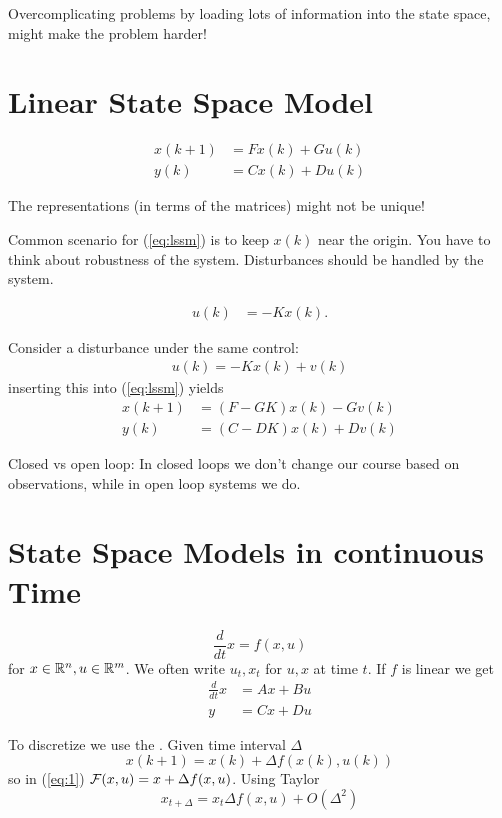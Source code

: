 \begin{remark}
    Overcomplicating problems by loading lots of information into the state space, might make the problem harder!
\end{remark}

\section{Linear State Space Model}

\begin{align}\label{eq:lssm}
    x(k+1)&=Fx(k)+Gu(k)\\
    y(k)&=Cx(k)+Du(k)
\end{align}

\begin{remark}
    The representations (in terms of the matrices) might not be unique!
\end{remark}

Common scenario for (\ref{eq:lssm}) is to keep \(x(k)\) near the origin. You have to think about robustness of the system. 
Disturbances should be handled by the system. 

\begin{align*}
    u(k)&=-Kx(k).
\end{align*}

Consider a disturbance under the same control:
\begin{align*}
    u(k)=-Kx(k)+v(k)
\end{align*} 
inserting this into (\ref{eq:lssm}) yields
\begin{align*}
    x(k+1) &= (F-GK)x(k)-Gv(k)\\
    y(k) &= (C-DK)x(k)+Dv(k)
\end{align*}

Closed vs open loop: In closed loops we don't change our course based on observations, while in open loop systems we do.

\section{State Space Models in continuous Time}

\[\frac{d}{dt}x=f(x,u)\]
for \(x\in \mathbb{R}^n, u\in \mathbb{R}^m\). We often write \(u_t,x_t\) for \(u,x\) at time \(t\).
If \(f\) is linear we get
\begin{align*}
    \frac{d}{dt}x&=Ax+Bu\\
    y&=Cx+Du
\end{align*}

To discretize we use the . Given time interval \(\Delta\)
\[x(k+1)=x(k)+\Delta f(x(k),u(k))\]
so in (\ref{eq:1}) \(\mathcal{F}(x,u)=x+\Delta f(x,u)\).
Using Taylor
\[x_{t+ \Delta}=x_t \Delta f(x,u)+O(\Delta^2)\]

